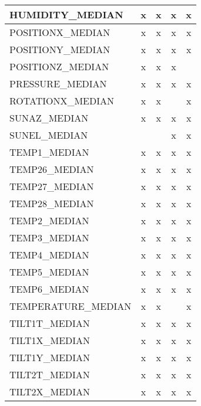 \begin{table}
\begin{tabular}{lcccc}
        HUMIDITY\_MEDIAN      &      x &      x &      x &      x  \\ \hline
        POSITIONX\_MEDIAN     &      x &      x &      x &      x  \\ \hline
        POSITIONY\_MEDIAN     &      x &      x &      x &      x  \\ \hline
        POSITIONZ\_MEDIAN     &      x &      x &      x &         \\ \hline
        PRESSURE\_MEDIAN      &      x &      x &      x &      x  \\ \hline
        ROTATIONX\_MEDIAN     &      x &      x &        &      x  \\ \hline
        SUNAZ\_MEDIAN        &      x &      x &      x &      x   \\ \hline
        SUNEL\_MEDIAN        &        &        &      x &      x   \\ \hline
        TEMP1\_MEDIAN        &      x &      x &      x &      x   \\ \hline
        TEMP26\_MEDIAN        &      x &      x &      x &      x  \\ \hline
        TEMP27\_MEDIAN        &      x &      x &      x &      x  \\ \hline
        TEMP28\_MEDIAN        &      x &      x &      x &      x  \\ \hline
        TEMP2\_MEDIAN        &      x &      x &      x &      x    \\ \hline
        TEMP3\_MEDIAN        &      x &      x &      x &      x    \\ \hline
        TEMP4\_MEDIAN        &      x &      x &      x &      x    \\ \hline
        TEMP5\_MEDIAN        &      x &      x &      x &      x    \\ \hline
        TEMP6\_MEDIAN        &      x &      x &      x &      x    \\ \hline
        TEMPERATURE\_MEDIAN  &      x &      x &        &      x    \\ \hline
        TILT1T\_MEDIAN       &      x &      x &      x &      x    \\ \hline
        TILT1X\_MEDIAN       &      x &      x &      x &      x    \\ \hline
        TILT1Y\_MEDIAN       &      x &      x &      x &      x    \\ \hline
        TILT2T\_MEDIAN       &      x &      x &      x &      x    \\ \hline
        TILT2X\_MEDIAN       &      x &      x &      x &      x    \\ \hline

\end{tabular}
\end{table}

